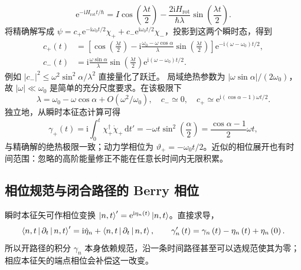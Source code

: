 \begin{equation}
\mathrm{e}^{-\mathrm{i}H_{\mathrm{rot}}t/\hbar}
=I\cos\left(\frac{\lambda t}{2}\right)
-\frac{2\mathrm{i}H_{\mathrm{rot}}}{\hbar\lambda}\sin\left(\frac{\lambda t}{2}\right).
\end{equation}
将精确解写成 $\psi=c_+\mathrm{e}^{-\mathrm{i}\omega_0t/2}\chi_+
+c_-\mathrm{e}^{\mathrm{i}\omega_0t/2}\chi_-$，投影到这两个瞬时态，得到
\begin{align}
c_+\left(t\right)&=\left[\cos\left(\frac{\lambda t}{2}\right)
-\mathrm{i}\frac{\omega_0-\omega\cos\alpha}{\lambda}\sin\left(\frac{\lambda t}{2}\right)\right]
\mathrm{e}^{-\mathrm{i}\left(\omega-\omega_0\right)t/2},\\
c_-\left(t\right)&=\mathrm{i}\frac{\omega\sin\alpha}{\lambda}
\sin\left(\frac{\lambda t}{2}\right)
\mathrm{e}^{\mathrm{i}\left(\omega-\omega_0\right)t/2}.
\end{align}
例如 $\left|c_-\right|^2\leq\omega^2\sin^2\alpha/\lambda^2$ 直接量化了跃迁。
局域绝热参数为 $\left|\omega\sin\alpha\right|/\left(2\omega_0\right)$，故 $\left|\omega\right|\ll\omega_0$ 是简单的充分尺度要求。在该极限下
\begin{equation}
\lambda=\omega_0-\omega\cos\alpha+O\left(\omega^2/\omega_0\right),\quad
c_-\simeq0,\quad
c_+\simeq\mathrm{e}^{\mathrm{i}\left(\cos\alpha-1\right)\omega t/2}.
\end{equation}
独立地，从瞬时本征态计算可得
\begin{equation}
\gamma_+\left(t\right)=\mathrm{i}\int_0^t\chi_+^\dagger\dot\chi_+\,\mathrm{d}t'
=-\omega t\sin^2\left(\frac\alpha2\right)
=\frac{\cos\alpha-1}{2}\omega t,
\end{equation}
与精确解的绝热极限一致；动力学相位为 $\vartheta_+=-\omega_0t/2$。近似的相位展开也有时间范围：忽略的高阶能量修正不能在任意长时间内无限积累。

\subsection{相位规范与闭合路径的 Berry 相位}
瞬时本征矢可作相位变换 $\Ket{n,t}'=\mathrm{e}^{\mathrm{i}\eta_n\left(t\right)}\Ket{n,t}$。直接求导，
\begin{equation}
\Braket{n,t|\partial_t|n,t}'=
\mathrm{i}\dot\eta_n+\Braket{n,t|\partial_t|n,t},\qquad
\gamma_n'\left(t\right)=\gamma_n\left(t\right)-\eta_n\left(t\right)+\eta_n\left(0\right).
\end{equation}
所以开路径的积分 $\gamma_n$ 本身依赖规范，沿一条时间路径甚至可以选规范使其为零；相应本征矢的端点相位会补偿这一改变。

